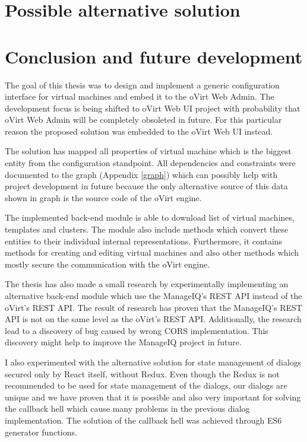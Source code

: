 \chapter{Possible alternative solution}

\chapter{Conclusion and future development}
The goal of this thesis was to design and implement a generic configuration interface for virtual machines and embed it to the oVirt Web Admin. The development focus is being shifted to oVirt Web UI project with probability that oVirt Web Admin will be completely obsoleted in future. For this particular reason the proposed solution was embedded to the oVirt Web UI instead.

The solution has mapped all properties of virtual machine which is the biggest entity from the configuration standpoint. All dependencies and constraints were documented to the graph (Appendix \ref{graph}) which can possibly help with project development in future because the only alternative source of this data shown in graph is the source code of the oVirt engine.

The implemented back-end module is able to download list of virtual machines, templates and clusters. The module also include methods which convert these entities to their individual internal representations. Furthermore, it contains methods for creating and editing virtual machines and also other methods which mostly secure the communication with the oVirt engine.

The thesis has also made a small research by experimentally implementing an alternative back-end module which use the ManageIQ's REST API instead of the oVirt's REST API. The result of research has proven that the ManageIQ's REST API is not on the same level as the oVirt's REST API. Additionally, the research lead to a discovery of bug caused by wrong CORS implementation. This discovery might help to improve the ManageIQ project in future. 

I also experimented with the alternative solution for state management of dialogs secured only by React itself, without Redux. Even though the Redux is not recommended to be used for state management of the dialogs, our dialogs are unique and we have proven that it is possible and also very important for solving the callback hell which cause many problems in the previous dialog implementation. The solution of the callback hell was achieved through ES6 generator functions.

